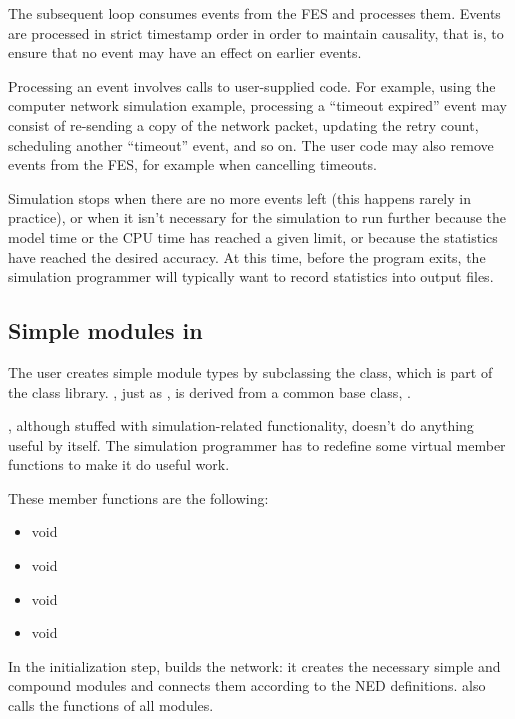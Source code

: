 The subsequent loop consumes events from the FES and processes
them. Events are processed in strict timestamp order in order
to maintain causality, that is, to ensure that no event may have
an effect on earlier events.

Processing an event involves calls to user-supplied code. For example,
using the computer network simulation example, processing a ``timeout
expired'' event may consist of re-sending a copy of the network
packet, updating the retry count, scheduling another ``timeout''
event, and so on. The user code may also remove events from the FES,
for example when cancelling timeouts.

Simulation stops when there are no more events left (this happens
rarely in practice), or when it isn't necessary for the simulation
to run further because the model time or the CPU time has reached
a given limit, or because the statistics have reached the desired
accuracy. At this time, before the program exits, the simulation
programmer will typically want to record statistics into output
files.





\subsection{Simple modules in {\opp}}

The user creates simple module types by
subclassing the 
class, which is part of the {\opp} class library.
, just as , is derived
from a common base class, .

, although stuffed with simulation-related
functionality, doesn't do anything useful by itself. The simulation
programmer has to redefine some virtual member functions to make it do
useful work.


These member functions are the following:
\begin{itemize}
  \item{void }
  \item{void }
  \item{void }
  \item{void }
\end{itemize}

In the initialization step, {\opp} builds the network: it creates the
necessary simple and compound modules and
connects them according to the NED definitions. {\opp} also calls the
 functions of all modules.

